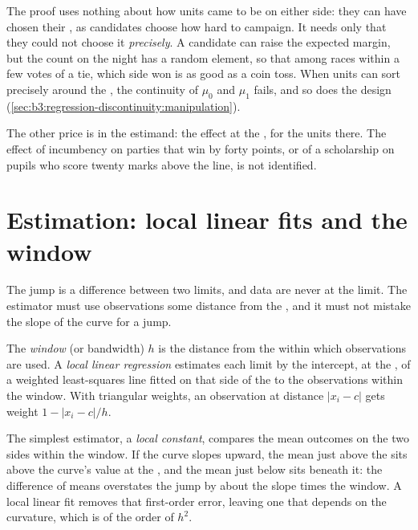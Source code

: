 The proof uses nothing about how units came to be on either side: they can
have chosen their , as candidates choose how hard to
campaign. It needs only that they could not choose it \emph{precisely}. A
candidate can raise the expected margin, but the count on the night has a
random element, so that among races within a few votes of a tie, which side
won is as good as a coin toss. When units can sort precisely around the ,
the continuity of $\mu_0$ and $\mu_1$ fails, and so does the design
(\cref{sec:b3:regression-discontinuity:manipulation}).

The other price is in the estimand: the effect at the , for the units
there. The effect of incumbency on parties that win by forty points, or of a
scholarship on pupils who score twenty marks above the line, is not
identified.

\section{Estimation: local linear fits and the window}\label{sec:b3:regression-discontinuity:estimation}

The jump is a difference between two limits, and data are never at the limit.
The estimator must use observations some distance from the , and it must
not mistake the slope of the curve for a jump.

\begin{definition}\label{def:b3:regression-discontinuity:local-linear}
The \emph{window} (or bandwidth) $h$ is the distance from the  within which
observations are used. A \emph{local linear regression} estimates each limit by
the intercept, at the , of a weighted least-squares line fitted on that
side of the  to the observations within the window. With triangular
weights, an observation at distance $|x_i - c|$ gets weight $1 - |x_i -
c|/h$.
\end{definition}

The simplest estimator, a \emph{local constant}, compares the mean outcomes on
the two sides within the window. If the curve slopes upward, the mean just above
the  sits above the curve's value at the , and the mean just below
sits beneath it: the difference of means overstates the jump by about the slope
times the window. A local linear fit removes that first-order error, leaving one
that depends on the curvature, which is of the order of $h^2$.


